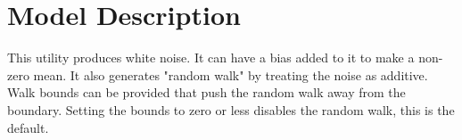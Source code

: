 \section{Model Description}

This utility produces white noise. It can have a bias added to it to make a non-zero mean. It also generates "random walk" by treating the noise as additive. Walk bounds can be provided that push the random walk away from the boundary. Setting the bounds to zero or less disables the random walk, this is the default.

